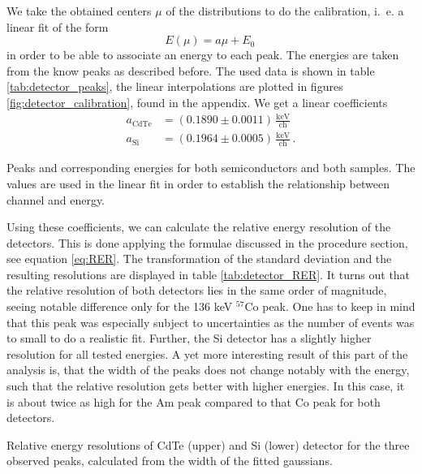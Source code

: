 We take the obtained centers $\mu$ of the distributions to do the calibration, 
i.~e. a linear fit of the form 
\begin{equation}
    E(\mu) = a \mu + E_0 \,
\end{equation}
in order to be able to associate an energy to each peak. The energies 
are taken from the know peaks as described before. The used data is shown in table 
\ref{tab:detector_peaks}, the linear interpolations are plotted in 
figures \ref{fig:detector_calibration}, found in the appendix. We get a linear coefficients
\begin{align}
    a_\mathrm{CdTe}  &=  (0.1890 \pm 0.0011)\, \mathrm{\frac{keV}{ch}}\, \\
    a_\mathrm{Si}  &=  (0.1964  \pm 0.0005)\, \mathrm{\frac{keV}{ch}} \, .
\end{align}
\begin{table}[htdp]
    \centering
    \caption{
        Peaks and corresponding energies for both semiconductors 
        and both samples. The values are used in the linear fit 
        in order to establish the relationship between channel 
        and energy.
        }
    
    \label{tab:detector_peaks}
\end{table}
Using these coefficients, we can calculate the relative energy resolution 
of the detectors. This is done applying the formulae discussed in the procedure 
section, see equation \eqref{eq:RER}. The transformation of the standard deviation 
and the resulting resolutions are displayed in table \ref{tab:detector_RER}. 
It turns out that the relative resolution of both detectors lies in the same 
order of magnitude, seeing notable difference only for the 136 keV $^{57}$Co peak.
One has to keep in mind that this peak was especially subject to uncertainties 
as the number of events was to small to do a realistic fit. Further, the Si 
detector has a slightly higher resolution for all tested energies. 
A yet more interesting result of this part of the analysis is, that 
the width of the peaks does not change notably with the energy, 
such that the relative resolution gets better with higher energies. 
In this case, it is about twice as high for the Am peak compared to 
that Co peak for both detectors. 
\begin{table}[htdp]
    \centering
    \caption{
        Relative energy resolutions of CdTe (upper) and 
        Si (lower) detector 
        for the three observed peaks, calculated from the 
        width of the fitted gaussians. 
        }
    
    \label{tab:detector_RER}
\end{table}
